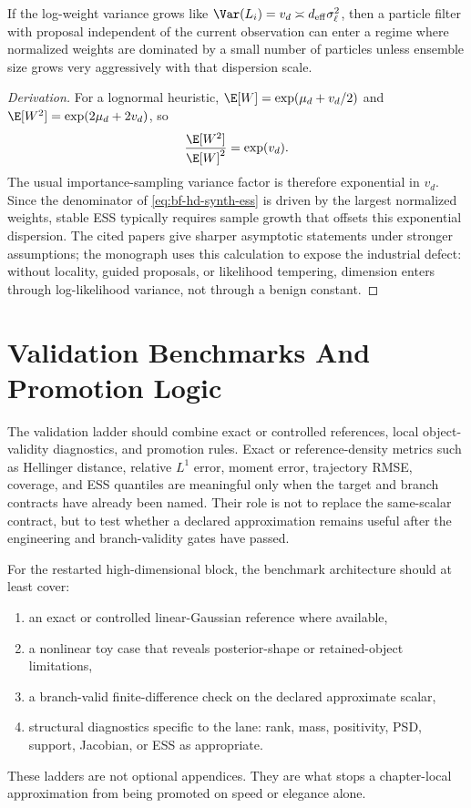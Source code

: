 \begin{proposition}
\label{prop:bf-hd-particle-collapse-calculus}
If the log-weight variance grows like
\(\Var(L_i)=v_d\asymp d_{\mathrm{eff}}\sigma_\ell^2\), then a particle filter
with proposal independent of the current observation can enter a regime where
normalized weights are dominated by a small number of particles unless ensemble
size grows very aggressively with that dispersion scale.
\end{proposition}

\begin{proof}[Derivation]
For a lognormal heuristic, \(\E[W]=\exp(\mu_d+v_d/2)\) and
\(\E[W^2]=\exp(2\mu_d+2v_d)\), so
\[
  \frac{\E[W^2]}{\E[W]^2}=\exp(v_d).
\]
The usual importance-sampling variance factor is therefore exponential in
\(v_d\).  Since the denominator of \eqref{eq:bf-hd-synth-ess} is driven by the
largest normalized weights, stable ESS typically requires sample growth that
offsets this exponential dispersion.  The cited papers give sharper asymptotic
statements under stronger assumptions; the monograph uses this calculation to
expose the industrial defect: without locality, guided proposals, or likelihood
tempering, dimension enters through log-likelihood variance, not through a
benign constant.
\end{proof}

\section{Validation Benchmarks And Promotion Logic}
\label{sec:bf-hd-validation-benchmarks}

The validation ladder should combine exact or controlled references, local
object-validity diagnostics, and promotion rules.  Exact or reference-density
metrics such as Hellinger distance, relative \(L^1\) error, moment error,
trajectory RMSE, coverage, and ESS quantiles are meaningful only when the target
and branch contracts have already been named.  Their role is not to replace the
same-scalar contract, but to test whether a declared approximation remains
useful after the engineering and branch-validity gates have passed.

For the restarted high-dimensional block, the benchmark architecture should at
least cover:
\begin{enumerate}[label=(\arabic*), leftmargin=0.28in]
  \item an exact or controlled linear-Gaussian reference where available,
  \item a nonlinear toy case that reveals posterior-shape or retained-object
  limitations,
  \item a branch-valid finite-difference check on the declared approximate scalar,
  \item structural diagnostics specific to the lane: rank, mass, positivity,
  PSD, support, Jacobian, or ESS as appropriate.
\end{enumerate}
These ladders are not optional appendices.  They are what stops a chapter-local
approximation from being promoted on speed or elegance alone.

